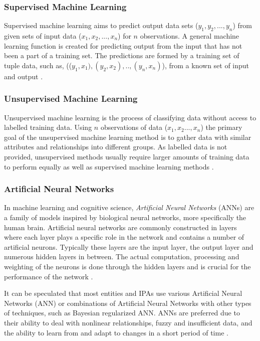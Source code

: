 \documentclass[preprint,12pt]{elsarticle}
\begin{document}
\subsubsection{Supervised Machine Learning}
Supervised machine learning aims to predict output data sets ($y_1, y_2,...,y_n$) from given sets of input data ($x_1, x_2,..., x_n$) for $n$ observations. A general machine learning function is created for predicting output from the input that has not been a part of a training set. The predictions are formed by a training set of tuple data, such as, (($y_1, x_1), (y_2, x_2),..,(y_n, x_n)$), from a known set of input and output \cite{russel2009}.

\subsubsection{Unsupervised Machine Learning}
Unsupervised machine learning is the process of classifying data without access to labelled training data. Using $n$ observations of data ($x_1, x_2..., x_n$) the primary goal of the unsupervised machine learning method is to gather data with similar attributes and relationships into different groups. As labelled data is not provided, unsupervised methods usually require larger amounts of training data to perform equally as well as supervised machine learning methods
\cite{russel2009}.

\subsubsection{Artificial Neural Networks}
In machine learning and cognitive science, \textit{Artificial Neural Networks} (ANNs) are a family of models inspired by biological neural networks, more specifically the human brain. Artificial neural networks are commonly constructed in layers where each layer plays a specific role in the network and contains a number of artificial neurons. Typically these layers are the input layer, the output layer and numerous hidden layers in between. The actual computation, processing and weighting of the neurons is done through the hidden layers and is crucial for the performance of the network \cite{olatunji2011}.

It can be speculated that most entities and IPAs use various Artificial Neural Networks (ANN) or combinations of Artificial Neural Networks with other types of techniques, such as Bayesian regularized ANN. ANNs are preferred due to their ability to deal with nonlinear relationships, fuzzy and insufficient data, and the ability to learn from and adapt to changes in a short period of time \cite{das2013}.
\end{document}
